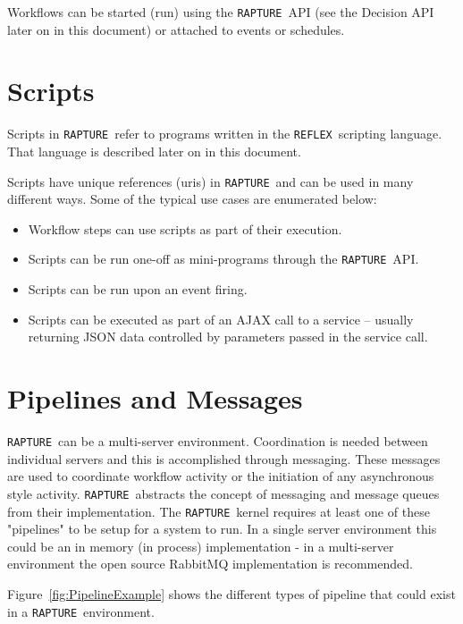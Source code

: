 \documentclass[12pt,twoside,a4paper]{book}
\newcommand{\Rapture}{\Verb+RAPTURE+~}
\newcommand{\Reflex}{\Verb+REFLEX+~}
\begin{document}
Workflows can be started (run) using the \Rapture API (see the Decision API later on in this document) or attached to events or schedules.

\section{Scripts}

Scripts in \Rapture refer to programs written in the \Reflex scripting language. That language is described later on in this document.

Scripts have unique references (uris) in \Rapture and can be used in many different ways. Some of the typical use cases are enumerated below:

\begin{itemize}
	\item{Workflow steps can use scripts as part of their execution.}
	\item{Scripts can be run one-off as mini-programs through the \Rapture API.}
	\item{Scripts can be run upon an event firing.}
	\item{Scripts can be executed as part of an AJAX call to a service -- usually returning JSON data controlled by parameters passed in the service call.}
\end{itemize}

\section{Pipelines and Messages}
\Rapture can be a multi-server environment. Coordination is needed between individual servers and this is accomplished through messaging. These messages are
used to coordinate workflow activity or the initiation of any asynchronous style activity. \Rapture abstracts the concept of messaging and message queues from their
implementation. The \Rapture kernel requires at least one of these "pipelines" to be setup for a system to run. In a single server environment
this could be an in memory (in process) implementation - in a multi-server environment the open source RabbitMQ implementation is recommended.

Figure~\vref{fig:PipelineExample} shows the different types of pipeline that could exist in a \Rapture environment.
\end{document}
